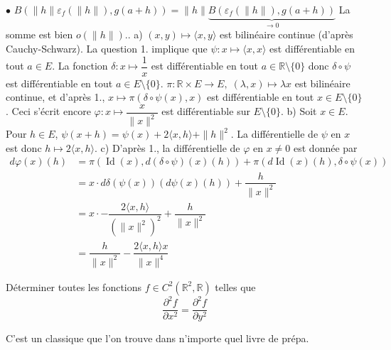 \documentclass{fancybook}
\DeclareMathOperator{\Id}{Id}
\begin{document}
$\bullet$ $B(\|h\|\varepsilon_f(\|h\|),g(a+h)) =\|h\| \underbrace{B(\varepsilon_f(\|h\|),g(a+h))}_{\to 0}$\newline \newline
La somme est bien $o(\|h\|)$.\newline {}. a) $(x,y)\mapsto\langle x,y \rangle$ est bilinéaire continue (d'après Cauchy-Schwarz). La question 1. implique que $\psi:x\mapsto \langle x,x \rangle$ est différentiable en tout $a\in  E$. La fonction $\delta: x\mapsto \dfrac 1x$ est différentiable en tout $a\in \mathbb R\setminus \{0\}$ donc $\delta\circ \psi$ est différentiable en tout $a\in E\setminus \{0\}$.\newline
$\pi: \mathbb R\times E \to  E,\; (\lambda,x)\mapsto \lambda x$ est bilinéaire continue, et d'après 1., $x\mapsto \pi(\delta\circ \psi(x),x)$ est différentiable en tout $x\in E\setminus \{0\}$.\newline
Ceci s'écrit encore $\varphi:x\mapsto \dfrac{x}{\|x\|^2}$ est différentiable sur $E\setminus \{0\}$. \newline 
\newline
b) Soit $x\in E$. Pour $h\in E$, $\psi(x+h)= \psi(x) + 2\langle x,h \rangle + \|h\|^2$. \newline
La différentielle de $\psi$ en $x$ est donc $h\mapsto 2\langle x,h \rangle$.\newline
\newline
c) D'après 1., la différentielle de $\varphi$ en $x\neq 0$ est donnée par $$ \begin{aligned} d\varphi(x)(h)&= \pi(\Id(x),d(\delta\circ \psi)(x)(h)) +\pi(d\Id(x)(h),\delta\circ \psi(x))\\
&= x\cdot d\delta(\psi(x))(d\psi(x)(h)) + \dfrac{h}{\|x\|^2}\\
&= x\cdot -\dfrac{2\langle x,h\rangle}{(\|x\|^2)^2} + \dfrac{h}{\|x\|^2}\\
&= \dfrac{h}{\|x\|^2} - \dfrac{2\langle x,h\rangle x}{\|x\|^4} \end{aligned}$$

\begin{exercice}
Déterminer toutes les fonctions $f\in C^2(\mathbb R^2,\mathbb R)$ telles que $$\dfrac{\partial^2f}{\partial x^2}=\dfrac{\partial^2f}{\partial y^2}$$
\end{exercice}
C'est un classique que l'on trouve dans n'importe quel livre de prépa.
\end{document}
